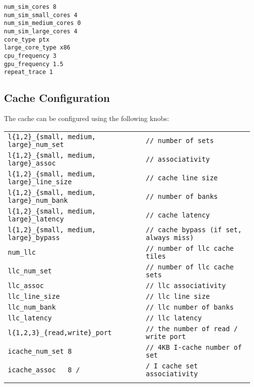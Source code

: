 \begin{Verbatim}
num_sim_cores 8
num_sim_small_cores 4
num_sim_medium_cores 0
num_sim_large_cores 4
core_type ptx
large_core_type x86
cpu_frequency 3
gpu_frequency 1.5
repeat_trace 1
\end{Verbatim}



\subsection{Cache Configuration}
\label{sec:knob:cache}

The cache can be configured using the following knobs:

\begin{tabular}{l l}
 \\
 \Verb+l{1,2}_{small, medium, large}_num_set+ & \Verb+// number of sets+ \\
 \Verb+l{1,2}_{small, medium, large}_assoc+ & \Verb+// associativity+ \\
 \Verb+l{1,2}_{small, medium, large}_line_size+ & \Verb+// cache line size+ \\
 \Verb+l{1,2}_{small, medium, large}_num_bank+ & \Verb+// number of banks+ \\
 \Verb+l{1,2}_{small, medium, large}_latency + & \Verb+// cache latency+ \\
 \Verb+l{1,2}_{small, medium, large}_bypass + & \Verb+// cache bypass (if set, always miss)+ \\
 \Verb+num_llc + & \Verb+// number of llc cache tiles+ \\
 \Verb+llc_num_set + & \Verb+// number of llc cache sets+ \\
 \Verb+llc_assoc + & \Verb+// llc associativity+ \\
 \Verb+llc_line_size+ & \Verb+// llc line size+ \\
 \Verb+llc_num_bank+ & \Verb+// llc number of banks+ \\
 \Verb+llc_latency + & \Verb+// llc latency+ \\
 \Verb+l{1,2,3}_{read,write}_port + & \Verb+// the number of read / write port+ \\
 \Verb+icache_num_set 8 + & \Verb+// 4KB I-cache number of set+ \\
 \Verb+icache_assoc   8 /+ & \Verb+/ I cache set associativity + \\
 \\
\end{tabular}

